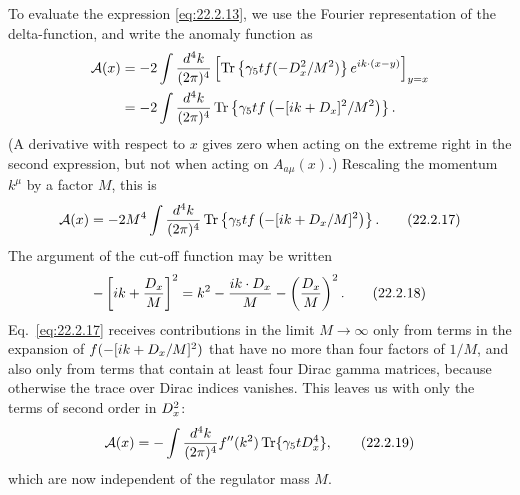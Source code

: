 To evaluate the expression \eqref{eq:22.2.13}, we use the Fourier
representation of the delta-function, and write the anomaly function as
\[
 \begin{aligned}
 \mathcal A(x)
 &=-2\int\frac{d^4k}{(2\pi)^4}
 \left[
  \operatorname{Tr}\left\{\gamma_5t f(-\sl{D}_x^2/M^2)\right\}
  e^{ik\cdot(x-y)}
 \right]_{y=x}\\
 &=-2\int\frac{d^4k}{(2\pi)^4}
 \operatorname{Tr}\left\{\gamma_5t
 f\left(-[i\sl{k}+\sl{D}_x]^2/M^2\right)\right\}.
 \end{aligned}
\]
(A derivative with respect to $x$ gives zero when acting on the extreme
right in the second expression, but not when acting on
$A_{a\mu}(x)$.) Rescaling the momentum $k^\mu$ by a factor $M$, this
is
\begin{equation}
 \mathcal A(x)=-2M^4\int\frac{d^4k}{(2\pi)^4}
 \operatorname{Tr}\left\{\gamma_5t
 f\left(-[i\sl{k}+\sl{D}_x/M]^2\right)\right\}.
 \tag{22.2.17}\label{eq:22.2.17}
\end{equation}
The argument of the cut-off function may be written
\begin{equation}
 -\left[i\sl{k}+\frac{\sl{D}_x}{M}\right]^2
 =k^2-\frac{ik\cdot D_x}{M}
 -\left(\frac{\sl{D}_x}{M}\right)^2.
 \tag{22.2.18}\label{eq:22.2.18}
\end{equation}
Eq.~\eqref{eq:22.2.17} receives contributions in the limit
$M\to\infty$ only from terms in the expansion of
$f(-[i\sl{k}+\sl{D}_x/M]^2)$ that have no more than four factors of
$1/M$, and also only from terms that contain at least four Dirac gamma
matrices, because otherwise the trace over Dirac indices vanishes. This
leaves us with only the terms of second order in $\sl{D}_x^2$:
\begin{equation}
 \mathcal A(x)=-\int\frac{d^4k}{(2\pi)^4}f''(k^2)
 \operatorname{Tr}\{\gamma_5t\sl{D}_x^4\},
 \tag{22.2.19}\label{eq:22.2.19}
\end{equation}
which are now independent of the regulator mass $M$.

